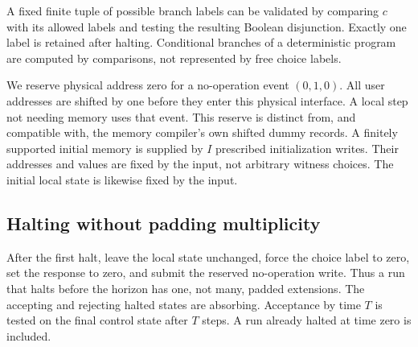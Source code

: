 \documentclass[11pt,a4paper]{article}
\theoremstyle{definition}
\theoremstyle{remark}
\begin{document}
A fixed finite tuple of possible branch labels can be validated by comparing
$c$ with its allowed labels and testing the resulting Boolean disjunction.
Exactly one label is retained after halting. Conditional branches of a
deterministic program are computed by comparisons, not represented by free
choice labels.

We reserve physical address zero for a no-operation event $(0,1,0)$. All user
addresses are shifted by one before they enter this physical interface. A
local step not needing memory uses that event. This reserve is distinct from,
and compatible with, the memory compiler's own shifted dummy records.
A finitely supported initial memory is supplied by $I$ prescribed initialization
writes. Their addresses and values are fixed by the input, not arbitrary
witness choices. The initial local state is likewise fixed by the input.

\subsection{Halting without padding multiplicity}
After the first halt, leave the local state unchanged, force the choice label
to zero, set the response to zero, and submit the reserved no-operation write.
Thus a run that halts before the horizon has one, not many, padded extensions.
The accepting and rejecting halted states are absorbing. Acceptance by time
$T$ is tested on the final control state after $T$ steps. A run already halted
at time zero is included.
\end{document}
